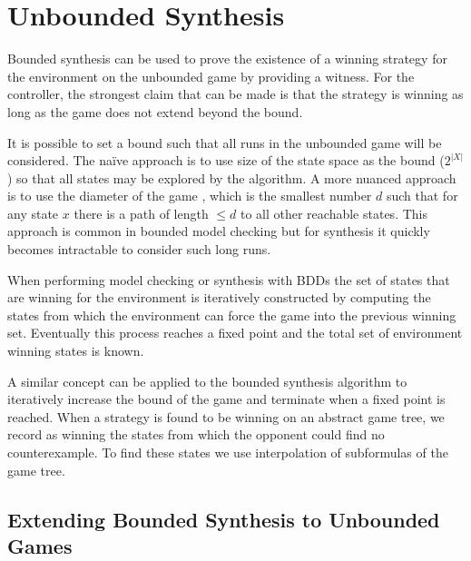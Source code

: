 \documentclass{llncs}
\begin{document}
\section{Unbounded Synthesis}

\label{sect:unbounded}

Bounded synthesis can be used to prove the existence of a winning strategy for
the environment on the unbounded game by providing a witness. For the
controller, the strongest claim that can be made is that the strategy is
winning as long as the game does not extend beyond the bound.

It is possible to set a bound such that all runs in the unbounded game will be
considered. The na\"ive approach is to use size of the state space as the bound
($2^{|X|}$) so that all states may be explored by the algorithm. A more nuanced
approach is to use the diameter of the game \cite{biere1999}, which is the
smallest number $d$ such that for any state $x$ there is a path of length $\leq
d$ to all other reachable states. This approach is common in bounded model
checking but for synthesis it quickly becomes intractable to consider such long
runs.

When performing model checking or synthesis with BDDs \cite{burch1990} the set
of states that are winning for the environment is iteratively constructed by
computing the states from which the environment can force the game into the
previous winning set. Eventually this process reaches a fixed point and the
total set of environment winning states is known.

A similar concept can be applied to the bounded synthesis algorithm to
iteratively increase the bound of the game and terminate when a fixed point is
reached. When a strategy is found to be winning on an abstract game tree, we
record as winning the states from which the opponent could find no
counterexample. To find these states we use interpolation of subformulas of the
game tree.


\subsection{Extending Bounded Synthesis to Unbounded Games}
\end{document}
